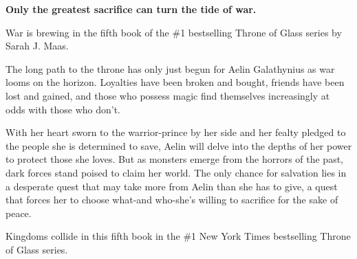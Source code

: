 
\newpage  %
\vspace*{2.5in}
\begin{Center}
\textbf{Only the greatest sacrifice can turn the tide of war.}

\hfill \break War is brewing in the fifth book of the \#1 bestselling Throne of Glass series by Sarah J. Maas.

\hfill \break The long path to the throne has only just begun for Aelin Galathynius as war looms on the horizon. Loyalties have been broken and bought, friends have been lost and gained, and those who possess magic find themselves increasingly at odds with those who don't.

\hfill \break With her heart sworn to the warrior-prince by her side and her fealty pledged to the people she is determined to save, Aelin will delve into the depths of her power to protect those she loves. But as monsters emerge from the horrors of the past, dark forces stand poised to claim her world. The only chance for salvation lies in a desperate quest that may take more from Aelin than she has to give, a quest that forces her to choose what-and who-she's willing to sacrifice for the sake of peace.

\hfill \break Kingdoms collide in this fifth book in the \#1 New York Times bestselling Throne of Glass series. 
\end{Center}
\vspace*{\fill}
